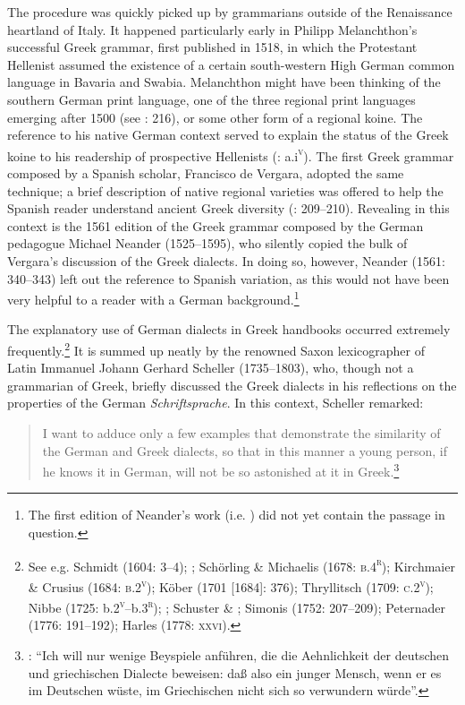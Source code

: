 \documentclass[output=paper]{langsci/langscibook}
\begin{document}
The procedure was quickly picked up by grammarians outside of the Renaissance heartland of Italy. It happened particularly early in Philipp Melanchthon’s successful Greek grammar, first published in 1518, in which the Protestant Hellenist assumed the existence of a certain south-western High German common language in Bavaria and Swabia. Melanchthon might have been thinking of the southern German print language, one of the three regional print languages emerging after 1500 (see \citealt{Mattheier2003}: 216), or some other form of a regional koine. The reference to his native German context served to explain the status of the Greek koine to his readership of prospective Hellenists (\citealt{Melanchthon1518}: a.i\textsc{\textsuperscript{v}}). The first Greek grammar composed by a Spanish scholar, Francisco de Vergara, adopted the same technique; a brief description of native regional varieties was offered to help the Spanish reader understand ancient Greek diversity (\citealt{Vergara1537}: 209–210). Revealing in this context is the 1561 edition of the Greek grammar composed by the German pedagogue Michael Neander (1525–1595), who silently copied the bulk of Vergara’s discussion of the Greek dialects. In doing so, however, Neander (1561: 340–343) left out the reference to Spanish variation, as this would not have been very helpful to a reader with a German background.\footnote{The first edition of Neander’s work (i.e. \citealt{Neander1553}) did not yet contain the passage in question.}

The explanatory use of German dialects in Greek handbooks occurred extremely frequently.\footnote{See e.g. Schmidt (1604: 3–4); \citet[83]{Rhenius1626}; Schörling \& Michaelis (1678: \textsc{b.4}\textsc{\textsuperscript{r}}); Kirchmaier \& Crusius (1684: \textsc{b.2}\textsc{\textsuperscript{v}}); Köber (1701 [1684]: 376); Thryllitsch (1709: \textsc{c.2}\textsc{\textsuperscript{v}}); Nibbe (1725: b.2\textsc{\textsuperscript{v}}\textsc{–}b.3\textsc{\textsuperscript{r}}); \citet[141]{Georgi1733}; Schuster \& \citet[13]{Lauterbach1737}; Simonis (1752: 207–209); Peternader (1776: 191–192); Harles (1778: \textsc{xxvi}).} It is summed up neatly by the renowned Saxon lexicographer of Latin Immanuel Johann Gerhard Scheller (1735–1803), who, though not a grammarian of Greek, briefly discussed the Greek dialects in his reflections on the properties of the German \textit{Schriftsprache}. In this context, Scheller remarked:

\begin{quote}
I want to adduce only a few examples that demonstrate the similarity of the German and Greek dialects, so that in this manner a young person, if he knows it in German, will not be so astonished at it in Greek.\footnote{\citet[229]{Scheller1772}: “Ich will nur wenige Beyspiele anführen, die die Aehnlichkeit der deutschen und griechischen Dialecte beweisen: daß also ein junger Mensch, wenn er es im Deutschen wüste, im Griechischen nicht sich so verwundern würde”.}
\end{quote}
\end{document}

